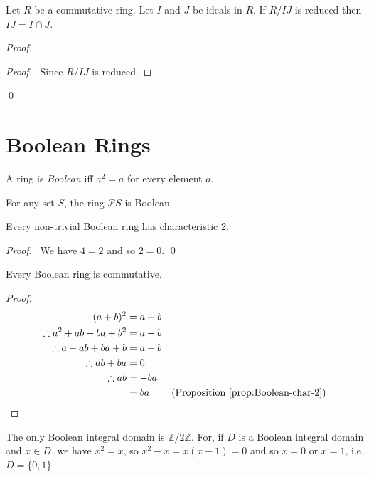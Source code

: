 \begin{prop}
Let $R$ be a commutative ring. Let $I$ and $J$ be ideals in $R$. If $R/IJ$ is reduced then $IJ = I \cap J$.
\end{prop}

\begin{proof}
\pf
{}
\begin{proof}
	\pf\ Since $R/IJ$ is reduced.
\end{proof}
\qed
\end{proof}

\chapter{Boolean Rings}

\begin{df}[Boolean]
A ring is \emph{Boolean} iff $a^2 = a$ for every element $a$.
\end{df}

\begin{ex}
For any set $S$, the ring $\mathcal{P} S$ is Boolean.
\end{ex}

\begin{prop}
\label{prop:Boolean-char-2}
Every non-trivial Boolean ring has characteristic 2.
\end{prop}

\begin{proof}
\pf\ We have $4 = 2$ and so $2 = 0$. \qed
\end{proof}

\begin{prop}
Every Boolean ring is commutative.
\end{prop}

\begin{proof}
\pf
\begin{align*}
(a+b)^2 & = a+b \\
\therefore a^2 + ab + ba + b^2 & = a+b \\
\therefore a + ab + ba + b & = a + b \\
\therefore ab + ba & = 0 \\
\therefore ab & = -ba \\
& = ba & (\text{Proposition \ref{prop:Boolean-char-2}})
\end{align*}
\end{proof}

\begin{ex}
The only Boolean integral domain is $\mathbb{Z} / 2 \mathbb{Z}$. For, if $D$ is a Boolean integral domain and $x \in D$, we have $x^2 = x$, so $x^2 - x = x(x-1) = 0$ and so $x = 0$ or $x = 1$, i.e. $D = \{0,1\}$.
\end{ex}

